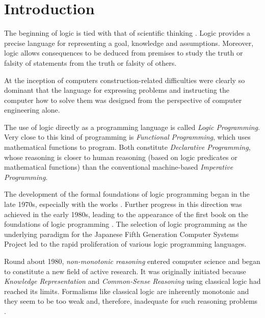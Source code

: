 \documentclass{tlp}
\begin{document}

\section{Introduction}
\label{introduction}

The beginning of logic is tied with that of scientific thinking
\cite{Art}. Logic provides a precise language for representing a goal,
knowledge and assumptions. Moreover, logic allows consequences to be deduced
from premises to study the truth or falsity of statements from the truth or
falsity of others.

At the inception of computers construction-related difficulties were
clearly so dominant that the language for expressing problems and
instructing the computer how to solve them was designed from the
perspective of computer engineering alone.

The use of logic directly as a programming language is called
\emph{Logic Programming}. Very close to this kind of programming is
\emph{Functional Programming}, which uses mathematical functions to
program. Both constitute \emph{Declarative Programming}, whose
reasoning is closer to human reasoning (based on logic predicates or
mathematical functions) than the conventional machine-based \emph{Imperative
Programming}.

The development of the formal foundations of logic programming began in the
late 1970s, especially with the works \cite{Emden,Clark,Reiter}. Further
progress in this direction was achieved in the early 1980s, leading to the
appearance of the first book on the foundations of logic programming
\cite{Lloyd}. The selection of logic programming as the underlying paradigm
for the Japanese Fifth Generation Computer Systems Project led to the rapid
proliferation of various logic programming languages.

Round about 1980, \emph{non-monotonic reasoning} entered computer
science and began to constitute a new field of active research. It was
originally initiated because \emph{Knowledge Representation} and
\emph{Common-Sense Reasoning} using classical logic had reached its
limits. Formalisms like classical logic are inherently monotonic and
they seem to be too weak and, therefore, inadequate for such reasoning
problems \cite{Dix97}.
\end{document}
